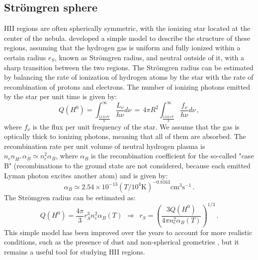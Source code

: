 \documentclass[fleqn,usenatbib]{mnras}
\begin{document}
\subsection{Strömgren sphere}\label{sec:stromgren_introduction}
HII regions are often spherically symmetric, with the ionizing star located at the center of the nebula.
\cite{Stromgren_1939} developed a simple model to describe the structure of these regions, assuming that the hydrogen gas is uniform and fully ionized within a certain radius $r_S$, known as Strömgren radius, and neutral outside of it, with a sharp transition between the two regions.
The Strömgren radius can be estimated by balancing the rate of ionization of hydrogen atoms by the star with the rate of recombination of protons and electrons.
The number of ionizing photons emitted by the star per unit time is given by:
\begin{equation}
  Q \left(H^0\right) = \int^\infty_{\frac{13.6\,\text{eV}}{h}} \dfrac{L_\nu}{h\nu} d\nu \, = \,
  4\pi R^2 \int^\infty_{\frac{13.6\,\text{eV}}{h}} \dfrac{f_\nu}{h\nu} d\nu \, ,
  \label{eq:photons_per_unit_time}
\end{equation}
where $f_\nu$ is the flux per unit frequency of the star.
We assume that the gas is optically thick to ionizing photons, meaning that all of them are absorbed.
The recombination rate per unit volume of neutral hydrogen plasma is $n_e n_{H^+} \alpha_B \simeq n_e^2 \alpha_B$, where $\alpha_B$ is the recombination coefficient for the so-called "case B" (recombinations to the ground state are not considered, because each emitted Lyman photon excites another atom) and is given by:
\begin{equation}
  \alpha_B \simeq 2.54 \times 10^{-13} \left(T/10^4 \text{K}\right)^{-0.8163} \text{cm}^3 \text{s}^{-1} \, .
  \label{eq:recombination_coefficient}
\end{equation}
The Strömgren radius can be estimated as:
\begin{equation}
  Q \left(H^0\right) = \dfrac{4\pi}{3} r_S^3 n_e^2 \alpha_B \left(T\right) 
  \:\: \Rightarrow \:\:
  r_S = \left( \dfrac{3 Q \left(H^0\right)}{4\pi n_e^2 \alpha_B \left(T\right)} \right)^{1/3} \, .
  \label{eq:stromgren_radius}
\end{equation}
This simple model has been improved over the years to account for more realistic conditions, such as the presence of dust \citep{Petrosian_1972} and non-spherical geometries \citep{McCullough_2000}, but it remains a useful tool for studying HII regions.
\end{document}
